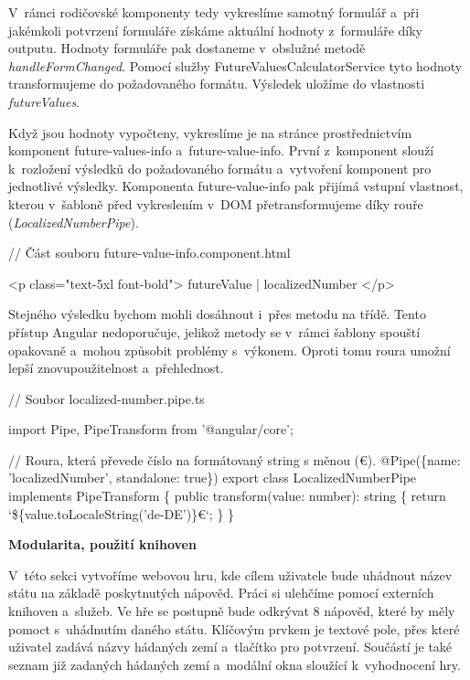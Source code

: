 V~rámci rodičovské komponenty tedy vykreslíme samotný formulář a~při jakémkoli potvrzení formuláře získáme aktuální hodnoty z~formuláře díky outputu. 
Hodnoty formuláře pak dostaneme v~obslužné metodě \emph{handleFormChanged}. Pomocí služby FutureValuesCalculatorService tyto hodnoty transformujeme do požadovaného formátu. 
Výsledek uložíme do vlastnosti \emph{futureValues}.

Když jsou hodnoty vypočteny, vykreslíme je na stránce prostřednictvím komponent future-values-info a~future-value-info. 
První z~komponent slouží k~rozložení výsledků do požadovaného formátu a~vytvoření komponent pro jednotlivé výsledky. 
Komponenta future-value-info pak přijímá vstupní vlastnost, kterou v~šabloně před vykreslením v~DOM přetransformujeme díky rouře (\emph{LocalizedNumberPipe}).

\begin{prog}
// Část souboru future-value-info.component.html

<p class="text-5xl font-bold">{{ futureValue | localizedNumber }}</p>
\end{prog}

Stejného výsledku bychom mohli dosáhnout i~přes metodu na třídě. Tento přístup Angular nedoporučuje, jelikož metody se v~rámci šablony spouští opakovaně a~mohou způsobit problémy s~výkonem. 
Oproti tomu roura umožní lepší znovupoužitelnost a~přehlednost.

\begin{prog}
// Soubor localized-number.pipe.ts

import {Pipe, PipeTransform} from '@angular/core';

// Roura, která převede číslo na formátovaný string s měnou (€).
@Pipe(\{name: 'localizedNumber', standalone: true\})
export class LocalizedNumberPipe implements PipeTransform \{
  public transform(value: number): string \{
    return `\$\{value.toLocaleString('de-DE')\}€`;
  \}
\}
\end{prog}

\begin{flushleft}
  \textbf{Modularita, použití knihoven}
\end{flushleft}

V~této sekci vytvoříme webovou hru, kde cílem uživatele bude uhádnout název státu na základě poskytnutých nápověd. Práci si ulehčíme pomocí externích knihoven a~služeb.
Ve hře se postupně bude odkrývat 8 nápověd, které by měly pomoct s~uhádnutím daného státu. 
Klíčovým prvkem je textové pole, přes které uživatel zadává názvy hádaných zemí a~tlačítko pro potvrzení. 
Součástí je také seznam již zadaných hádaných zemí a~modální okna sloužící k~vyhodnocení hry.

